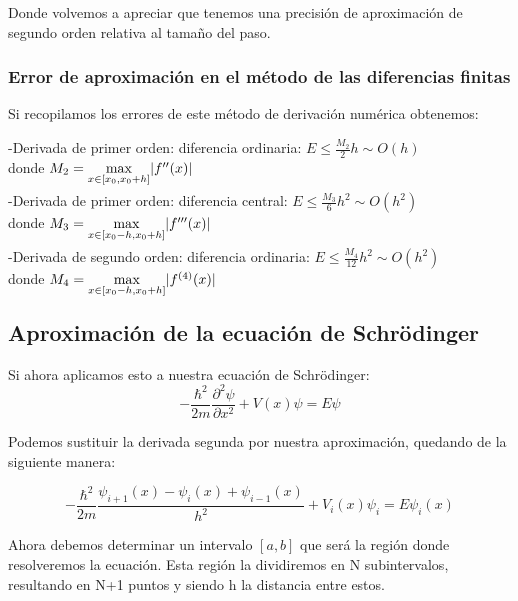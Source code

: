 \documentclass[12pt]{article}
\begin{document}
Donde volvemos a apreciar que tenemos una precisión de aproximación de segundo orden relativa al tamaño del paso.

\subsubsection{Error de aproximación en el método de las diferencias finitas}

Si recopilamos los errores de este método de derivación numérica obtenemos:

\begin{flushleft}
-Derivada de primer orden: diferencia ordinaria: 
$E \leq \frac{M_2}{2}h \sim O(h)$\\ donde $M_2 = \smash{\displaystyle\max_{x \in [x_0,x_0+h]}} |f''(x)|$
\end{flushleft}

\begin{flushleft}
-Derivada de primer orden: diferencia central: 
$E \leq \frac{M_3}{6}h^2 \sim O(h^2)$\\ donde $M_3 = \smash{\displaystyle\max_{x \in [x_0-h,x_0+h]}} |f'''(x)|$
\end{flushleft}

\begin{flushleft}
-Derivada de segundo orden: diferencia ordinaria:
$E \leq \frac{M_4}{12}h^2 \sim O(h^2)$\\ donde $M_4 = \smash{\displaystyle\max_{x \in [x_0-h,x_0+h]}} |f^{(4)}(x)|$
\end{flushleft}




\subsection{Aproximación de la ecuación de Schrödinger}
Si ahora aplicamos esto a nuestra ecuación de Schrödinger:
\begin{equation*}
-\frac{\hbar^2}{2m} \frac{\partial^2\psi}{\partial x^2} + V(x)\psi = E \psi
\end{equation*}

Podemos sustituir la derivada segunda por nuestra aproximación, quedando de la siguiente manera:

\begin{equation}
-\frac{\hbar^2}{2m} \frac{\psi_{i+1}(x)-\psi_i(x)+\psi_{i-1}(x)}{h^2} + V_i(x)\psi_i = E \psi_i(x)
\end{equation}

Ahora debemos determinar un intervalo $[a,b]$ que será la región donde resolveremos 
la ecuación. Esta región la dividiremos en N subintervalos, resultando en N+1 puntos y siendo h la distancia entre estos.\\
\end{document}

